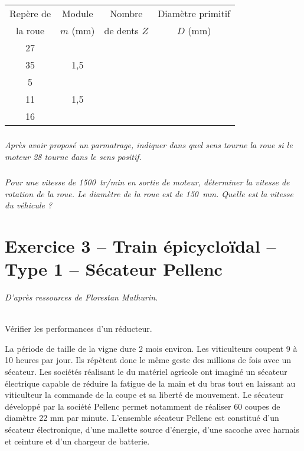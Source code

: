 \documentclass[10pt,fleqn]{article} %
\begin{document}
\begin{multicols}{2}
\footnotesize
\begin{center}
\begin{tabular}{|c|c|c|c|}
\hline
Repère de  & Module  & Nombre & Diamètre primitif  \\
la roue & $m$ (mm) & de dents $Z$ & $D$ (mm) \\
\hline
\hline
27 & & & \\ \hline
35 & 1,5& & \\ \hline
5& & & \\ \hline
11& 1,5 & & \\ \hline
16& & & \\ \hline

\end{tabular}
\end{center}

\normalsize

\subparagraph{}
\textit{Après avoir proposé un parmatrage, indiquer dans quel sens tourne la roue si le moteur 28 tourne dans le sens positif.}

\subparagraph{}
\textit{Pour une vitesse de \SI{1500}{tr/min} en sortie de moteur, déterminer la vitesse de rotation de la roue. Le diamètre de la roue est de \SI{150}{mm}. Quelle est la vitesse du véhicule ? }
\ifprof
\begin{corrige}
\end{corrige}
\else
\fi

\section*{Exercice 3 -- Train épicycloïdal -- Type 1 -- Sécateur Pellenc}
\setcounter{exo}{0}
\textit{D'après ressources de Florestan Mathurin.}

\begin{obj}~\\
Vérifier les performances d'un réducteur.
\end{obj}


La période de taille de la vigne dure 2 mois environ. Les viticulteurs coupent 9 à 10 heures par jour. Ils répètent donc le même geste des millions de fois avec un sécateur. Les sociétés réalisant le du matériel agricole ont imaginé un sécateur électrique capable de réduire la fatigue de la main et du bras tout en laissant au viticulteur la commande de la coupe et sa liberté de mouvement. Le sécateur développé par la société Pellenc permet notamment de réaliser 60 coupes de diamètre 22 mm par minute. L’ensemble sécateur Pellenc est constitué d’un sécateur électronique, d’une mallette source d’énergie, d’une sacoche avec harnais et ceinture et d’un chargeur de batterie.


\end{multicols}
\end{document}
